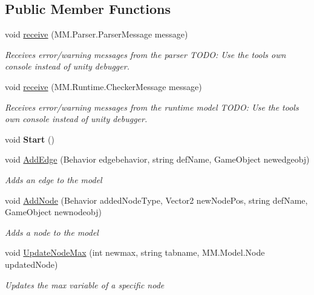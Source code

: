 \subsection*{Public Member Functions}
\begin{DoxyCompactItemize}
\item 
void \hyperlink{class_model_controller_ace07b89fa66aa3855d9fd888e98d3c07}{receive} (M\+M.\+Parser.\+Parser\+Message message)
\begin{DoxyCompactList}\small\item\em Receives error/warning messages from the parser T\+O\+DO\+: Use the tools own console instead of unity debugger. \end{DoxyCompactList}\item 
void \hyperlink{class_model_controller_ad66a01d17f0bdff7f3a668e8dd37fd43}{receive} (M\+M.\+Runtime.\+Checker\+Message message)
\begin{DoxyCompactList}\small\item\em Receives error/warning messages from the runtime model T\+O\+DO\+: Use the tools own console instead of unity debugger. \end{DoxyCompactList}\item 
\mbox{\label{class_model_controller_aeb277810748a80f9a3b9478d92c91b7b}} 
void {\bfseries Start} ()
\item 
void \hyperlink{class_model_controller_add55c5cac76924f59e57adffee93ae79}{Add\+Edge} (Behavior edgebehavior, string def\+Name, Game\+Object newedgeobj)
\begin{DoxyCompactList}\small\item\em Adds an edge to the model \end{DoxyCompactList}\item 
void \hyperlink{class_model_controller_a19cbb949bcd04111795784724d883975}{Add\+Node} (Behavior added\+Node\+Type, Vector2 new\+Node\+Pos, string def\+Name, Game\+Object newnodeobj)
\begin{DoxyCompactList}\small\item\em Adds a node to the model \end{DoxyCompactList}\item 
void \hyperlink{class_model_controller_a7bdefba3d9a2445710046462819bb5dd}{Update\+Node\+Max} (int newmax, string tabname, M\+M.\+Model.\+Node updated\+Node)
\begin{DoxyCompactList}\small\item\em Updates the max variable of a specific node \end{DoxyCompactList}\item 

\end{DoxyCompactItemize}

